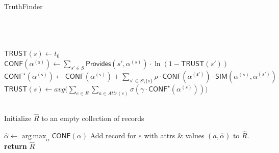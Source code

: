 \documentclass{acm_proc_article-sp}
\DeclareMathOperator*{\argmax}{arg\,max}
\begin{document}
\begin{algorithm}
\caption{TruthFinder}
\begin{algorithmic}[1]
\small
{} \\
 \\
 \\

\State $\mathsf{TRUST}(s) \leftarrow t_0$
\EndFor
\\
\State $\mathsf{CONF(\alpha^{(s)})} \leftarrow \sum_{s' \in S} \mathsf{Provides}(s',\alpha^{(s)}) \cdot \ln(1-\mathsf{TRUST}(s'))$
\EndFor
{}
\State $\mathsf{CONF^\star(\alpha^{(s)})} \leftarrow \mathsf{CONF(\alpha^{(s)})} +   \sum_{s' \in S \setminus \{s\}} \rho \cdot \mathsf{CONF(\alpha^{(s')})}  \cdot \mathsf{SIM}(\alpha^{(s)},\alpha^{(s')})$
\EndFor
\EndFor
{}
\State $\mathsf{TRUST}(s) \leftarrow avg \big ( \sum_{e \in E}\sum_{a \in Attr(e)} \sigma(\gamma \cdot \mathsf{CONF}^\star(\alpha^{(s)})) \big )$
\EndFor
\EndWhile

\\
\State Initialize $\hat{R}$ to an empty collection of records

\State $\hat{\alpha} \leftarrow \argmax_{\alpha} \mathsf{CONF}(\alpha)$
\EndFor
\State Add record for $e$ with attrs \& values $(a, \hat{\alpha})$ to $\hat{R}$.
\EndFor
\\

\State \textbf{return} $\hat{R}$
\EndFunction
\end{algorithmic}
\label{alg:tf}
\end{algorithm}  
\end{document}
